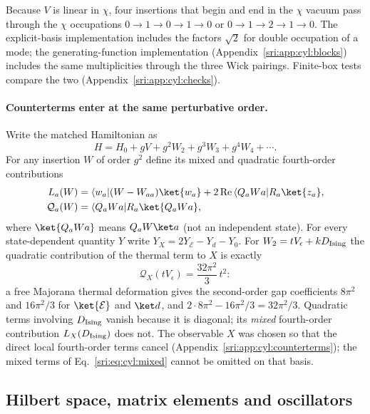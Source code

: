 Because $V$ is linear in $\chi$, four insertions that begin and end in the $\chi$ vacuum pass through the $\chi$
occupations $0\to1\to0\to1\to0$ or $0\to1\to2\to1\to0$. The explicit-basis implementation includes the factors
$\sqrt2$ for double occupation of a mode; the generating-function implementation (Appendix~\ref{sri:app:cyl:blocks}) includes
the same multiplicities through the three Wick pairings. Finite-box tests compare the two
(Appendix~\ref{sri:app:cyl:checks}).

\paragraph{Counterterms enter at the same perturbative order.} Write the matched Hamiltonian as
\begin{equation}
 H=H_0+gV+g^2W_2+g^3W_3+g^4W_4+\cdots.
\end{equation}
For any insertion $W$ of order $g^2$ define its mixed and quadratic fourth-order contributions
\begin{align}
 L_a(W)&=\langle w_a\rvert(W-W_{aa})\ket{w_a}+2\,{\rm Re}\,\langle Q_aWa\rvert R_a\ket{z_a},\notag\\
 \mathcal Q_a(W)&=\langle Q_aWa\rvert R_a\ket{Q_aWa},
 \label{sri:eq:cyl:mixed}
\end{align}
where $\ket{Q_aWa}$ means $Q_aW\ket a$ (not an independent state). For every state-dependent quantity $Y$ write
$Y_X=2Y_{\mathcal E}-Y_d-Y_0$. For $W_2=tV_\epsilon+kD_{\rm Ising}$ the quadratic contribution of the thermal term to $X$
is exactly
\begin{equation}
 \mathcal Q_X(tV_\epsilon)=\frac{32\pi^2}{3}\,t^2:
 \label{sri:eq:cyl:thermalsq}
\end{equation}
a free Majorana thermal deformation gives the second-order gap coefficients $8\pi^2$ and $16\pi^2/3$ for $\ket{\mathcal
E}$ and $\ket d$, and $2\cdot8\pi^2-16\pi^2/3=32\pi^2/3$. Quadratic terms involving $D_{\rm Ising}$ vanish because it is
diagonal; its \emph{mixed} fourth-order contribution $L_X(D_{\rm Ising})$ does not. The observable $X$ was chosen so
that the direct local fourth-order terms cancel (Appendix~\ref{sri:app:cyl:counterterms}); the mixed terms of
Eq.~\eqref{sri:eq:cyl:mixed} cannot be omitted on that basis.

\subsection{Hilbert space, matrix elements and oscillators}\label{sri:app:cyl:hilbert}
